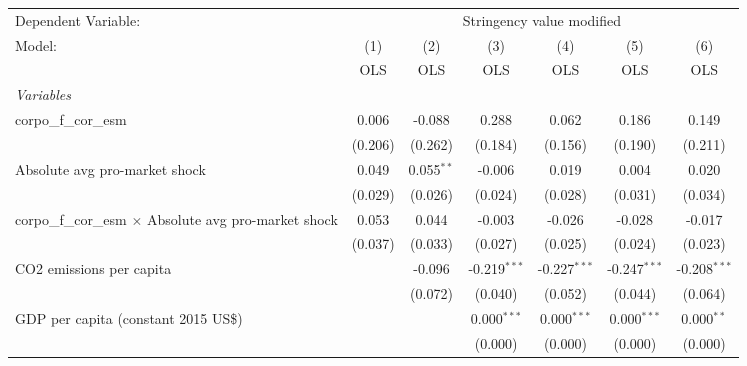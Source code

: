 
\begingroup
\centering
\begin{tabular}{lcccccc}
   \toprule
   Dependent Variable: & \multicolumn{6}{c}{Stringency value modified}\\
   Model:                                                        & (1)     & (2)          & (3)            & (4)            & (5)            & (6)\\  
                                                                 &  OLS    & OLS          & OLS            & OLS            & OLS            & OLS\\  
   \midrule
   \emph{Variables}\\
   corpo\_f\_cor\_esm                                            & 0.006   & -0.088       & 0.288          & 0.062          & 0.186          & 0.149\\   
                                                                 & (0.206) & (0.262)      & (0.184)        & (0.156)        & (0.190)        & (0.211)\\   
   Absolute avg pro-market shock                                 & 0.049   & 0.055$^{**}$ & -0.006         & 0.019          & 0.004          & 0.020\\   
                                                                 & (0.029) & (0.026)      & (0.024)        & (0.028)        & (0.031)        & (0.034)\\   
   corpo\_f\_cor\_esm $\times$ Absolute avg pro-market shock     & 0.053   & 0.044        & -0.003         & -0.026         & -0.028         & -0.017\\   
                                                                 & (0.037) & (0.033)      & (0.027)        & (0.025)        & (0.024)        & (0.023)\\   
   CO2 emissions per capita                                      &         & -0.096       & -0.219$^{***}$ & -0.227$^{***}$ & -0.247$^{***}$ & -0.208$^{***}$\\   
                                                                 &         & (0.072)      & (0.040)        & (0.052)        & (0.044)        & (0.064)\\   
   GDP per capita (constant 2015 US\$)                           &         &              & 0.000$^{***}$  & 0.000$^{***}$  & 0.000$^{***}$  & 0.000$^{**}$\\   
                                                                 &         &              & (0.000)        & (0.000)        & (0.000)        & (0.000)\\   

\end{tabular}

